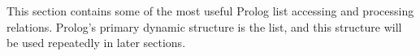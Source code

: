 \label{fish27}

This section contains some of the most useful Prolog list accessing and
processing relations. Prolog's primary dynamic structure is the list, and this
structure will be used repeatedly in later sections.
